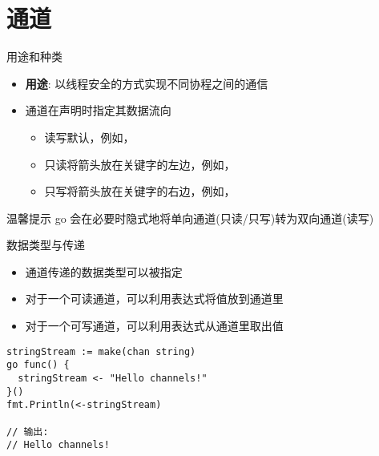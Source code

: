 \section{通道\channel }
\begin{frame}{用途和种类}
    \begin{itemize}
        \item \textbf{用途}: 以线程安全的方式实现不同协程之间的通信 
        \item 通道在声明时指定其数据流向
            \begin{itemize}
                \item \alert{读写}\quad 默认，例如，
                \item \alert{只读}\quad 将\code{<-}箭头放在关键字的左边，例如，
                \item \alert{只写}\quad 将\code{<-}箭头放在关键字的右边，例如，
            \end{itemize}
    \end{itemize}

    \begin{exampleblock}{温馨提示}
        go 会在必要时隐式地将单向通道(只读/只写)转为双向通道(读写) 
    \end{exampleblock}
\end{frame}

\begin{frame}[fragile]{数据类型与传递}
    \begin{itemize}
        \item 通道传递的数据类型可以被指定
        \item 对于一个可读通道，可以利用表达式将值放到通道里
        \item 对于一个可写通道，可以利用表达式从通道里取出值
    \end{itemize}
\begin{lstlisting}[caption={通道数据传递样例}]
stringStream := make(chan string)
go func() {
  stringStream <- "Hello channels!"
}()
fmt.Println(<-stringStream)

// 输出:
// Hello channels!    
\end{lstlisting}    
\end{frame}

